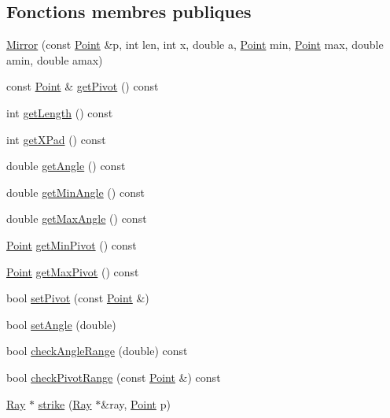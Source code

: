\subsection*{Fonctions membres publiques}
\begin{DoxyCompactItemize}
\item 
\mbox{\hyperlink{class_mirror_abc3fa4b3569596f9234cece92dbdc677}{Mirror}} (const \mbox{\hyperlink{class_point}{Point}} \&p, int len, int x, double a, \mbox{\hyperlink{class_point}{Point}} min, \mbox{\hyperlink{class_point}{Point}} max, double amin, double amax)
\item 
const \mbox{\hyperlink{class_point}{Point}} \& \mbox{\hyperlink{class_mirror_af419b1b2478e02211ff5b6369453a7ca}{get\+Pivot}} () const
\item 
int \mbox{\hyperlink{class_mirror_ad34397fa07da0b668c4baad8bb52feed}{get\+Length}} () const
\item 
int \mbox{\hyperlink{class_mirror_a2cf5f8d8bff3cca5acd320addca8c220}{get\+X\+Pad}} () const
\item 
double \mbox{\hyperlink{class_mirror_a940340beb2acaf99f7942615f5ef82a0}{get\+Angle}} () const
\item 
double \mbox{\hyperlink{class_mirror_ac810eb7d7cc4377e7513cb5de32808de}{get\+Min\+Angle}} () const
\item 
double \mbox{\hyperlink{class_mirror_a89bfd8251862a7b732263e3c248e16bc}{get\+Max\+Angle}} () const
\item 
\mbox{\hyperlink{class_point}{Point}} \mbox{\hyperlink{class_mirror_ae978b1372db039cb296348062425171c}{get\+Min\+Pivot}} () const
\item 
\mbox{\hyperlink{class_point}{Point}} \mbox{\hyperlink{class_mirror_a076c93924786f27c8f203aa2574062bb}{get\+Max\+Pivot}} () const
\item 
bool \mbox{\hyperlink{class_mirror_a83f8934245fe330510b031a19fa77fbe}{set\+Pivot}} (const \mbox{\hyperlink{class_point}{Point}} \&)
\item 
bool \mbox{\hyperlink{class_mirror_aa5c28cf6d8a88d11f06b4140389c2a06}{set\+Angle}} (double)
\item 
bool \mbox{\hyperlink{class_mirror_a146f30f2eac7d90bd48d5b5a47d9828d}{check\+Angle\+Range}} (double) const
\item 
bool \mbox{\hyperlink{class_mirror_ace5833b122c139bb448cf95509a681d3}{check\+Pivot\+Range}} (const \mbox{\hyperlink{class_point}{Point}} \&) const
\item 
\mbox{\hyperlink{class_ray}{Ray}} $\ast$ \mbox{\hyperlink{class_mirror_aa943dbc39297e6c9ca0935ec25ecb96e}{strike}} (\mbox{\hyperlink{class_ray}{Ray}} $\ast$\&ray, \mbox{\hyperlink{class_point}{Point}} p)

\end{DoxyCompactItemize}
